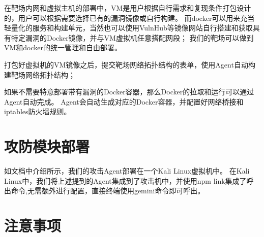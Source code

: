 \documentclass[lang=cn,10pt]{elegantbook}
\begin{document}
在靶场内网和虚拟主机的部署中，VM是用户根据自行需求和复现条件打包设计的，用户可以根据需要选择已有的漏洞镜像或自行构建。
而docker可以用来充当轻量化的服务和构建单元，当然也可以使用VulnHub等镜像网站自行搭建和获取具有特定漏洞的Docker镜像，并与VM虚拟机任意搭配网段；
我们的靶场可以做到VM和docker的统一管理和自由部署。

打包好虚拟机的VM镜像之后，提交靶场网络拓扑结构的表单，使用Agent自动构建靶场网络拓扑结构；

如果不需要特意部署带有漏洞的Docker容器，那么Docker的拉取和运行可以通过Agent自动完成。
Agent会自动生成对应的Docker容器，并配置好网络桥接和iptables防火墙规则。



\section{攻防模块部署}

如文档中介绍所示，我们的攻击Agent部署在一个Kali Linux虚拟机中。
在Kali Linux中，我们将上述提到的Agent集成到了攻击机中，并使用npm link集成了呼出命令,无需额外进行配置，直接终端使用gemini命令即可呼出。


\section{注意事项}





\end{document}
